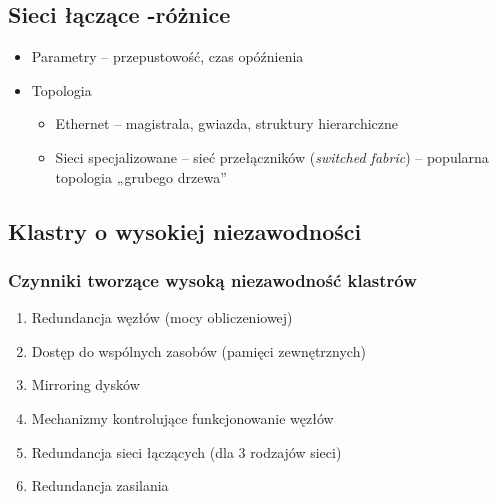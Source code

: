 	\subsection{Sieci łączące -różnice}
		\begin{itemize}
			\item Parametry – przepustowość, czas opóźnienia
			\item Topologia
			\begin{itemize}
				\item Ethernet – magistrala, gwiazda, struktury hierarchiczne
				\item Sieci specjalizowane – sieć przełączników (\textit{switched fabric}) – popularna topologia „grubego drzewa”
			\end{itemize}
		\end{itemize}
	\subsection{Klastry o wysokiej niezawodności}
		\subsubsection{Czynniki tworzące wysoką niezawodność klastrów}
			\begin{enumerate}
				\item Redundancja węzłów (mocy obliczeniowej)
				\item Dostęp do wspólnych zasobów (pamięci zewnętrznych)
				\item Mirroring dysków
				\item Mechanizmy kontrolujące funkcjonowanie węzłów
				\item Redundancja sieci łączących (dla 3 rodzajów sieci)
				\item Redundancja zasilania
			\end{enumerate}
